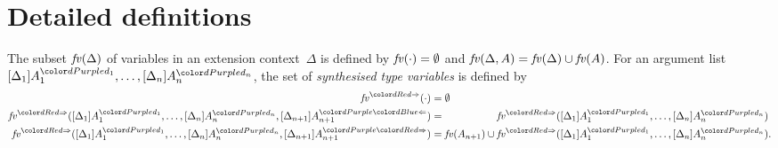 
\section{Detailed definitions}\label{sec:defs-proofs}

\begin{defn}\label{def:syn-var}
  The subset $\mathit{fv}(\Delta)$ of variables in an extension context~$\Delta$ is defined by\/ $\mathit{fv}(\cdot) = \emptyset$ and\/ $\mathit{fv}(\Delta, A) = \mathit{fv}(\Delta) \cup \mathit{fv}(A)$.
  For an argument list $\biargs$, the set of \emph{synthesised type variables} is defined by 
  \small
  \begin{align*}
    \synvar(\cdot)                   & = \emptyset  \\
    \synvar(\biargs, \chkbiarg[n+1]) & = \phantom{\fv(A_{n+1}) \cup {}} \synvar(\biargs) \\
    \synvar(\biargs, \synbiarg[n+1]) & = \fv(A_{n+1}) \cup           \synvar(\biargs).
  \end{align*}
\end{defn}

